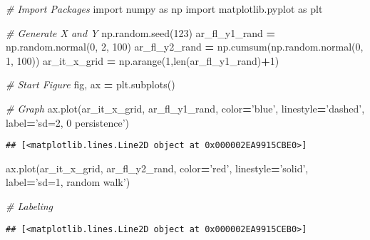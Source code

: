 \documentclass[
]{book}
\newenvironment{Shaded}{\begin{snugshade}}{\end{snugshade}}
\newcommand{\BuiltInTok}[1]{#1}
\newcommand{\CommentTok}[1]{\textcolor[rgb]{0.56,0.35,0.01}{\textit{#1}}}
\newcommand{\DecValTok}[1]{\textcolor[rgb]{0.00,0.00,0.81}{#1}}
\newcommand{\ImportTok}[1]{#1}
\newcommand{\NormalTok}[1]{#1}
\newcommand{\OperatorTok}[1]{\textcolor[rgb]{0.81,0.36,0.00}{\textbf{#1}}}
\newcommand{\StringTok}[1]{\textcolor[rgb]{0.31,0.60,0.02}{#1}}
\begin{document}
\begin{Shaded}
\begin{Highlighting}[]
\CommentTok{# Import Packages}
\ImportTok{import}\NormalTok{ numpy }\ImportTok{as}\NormalTok{ np}
\ImportTok{import}\NormalTok{ matplotlib.pyplot }\ImportTok{as}\NormalTok{ plt}

\CommentTok{# Generate X and Y}
\NormalTok{np.random.seed(}\DecValTok{123}\NormalTok{)}
\NormalTok{ar_fl_y1_rand }\OperatorTok{=}\NormalTok{ np.random.normal(}\DecValTok{0}\NormalTok{, }\DecValTok{2}\NormalTok{, }\DecValTok{100}\NormalTok{)}
\NormalTok{ar_fl_y2_rand }\OperatorTok{=}\NormalTok{ np.cumsum(np.random.normal(}\DecValTok{0}\NormalTok{, }\DecValTok{1}\NormalTok{, }\DecValTok{100}\NormalTok{))}
\NormalTok{ar_it_x_grid }\OperatorTok{=}\NormalTok{ np.arange(}\DecValTok{1}\NormalTok{,}\BuiltInTok{len}\NormalTok{(ar_fl_y1_rand)}\OperatorTok{+}\DecValTok{1}\NormalTok{)}

\CommentTok{# Start Figure}
\NormalTok{fig, ax }\OperatorTok{=}\NormalTok{ plt.subplots()}

\CommentTok{# Graph}
\NormalTok{ax.plot(ar_it_x_grid, ar_fl_y1_rand,}
\NormalTok{                     color}\OperatorTok{=}\StringTok{'blue'}\NormalTok{, linestyle}\OperatorTok{=}\StringTok{'dashed'}\NormalTok{,}
\NormalTok{                     label}\OperatorTok{=}\StringTok{'sd=2, 0 persistence'}\NormalTok{)}
\end{Highlighting}
\end{Shaded}

\begin{verbatim}
## [<matplotlib.lines.Line2D object at 0x000002EA9915CBE0>]
\end{verbatim}

\begin{Shaded}
\begin{Highlighting}[]
\NormalTok{ax.plot(ar_it_x_grid, ar_fl_y2_rand,}
\NormalTok{                     color}\OperatorTok{=}\StringTok{'red'}\NormalTok{, linestyle}\OperatorTok{=}\StringTok{'solid'}\NormalTok{,}
\NormalTok{                     label}\OperatorTok{=}\StringTok{'sd=1, random walk'}\NormalTok{)}
                     
\CommentTok{# Labeling}
\end{Highlighting}
\end{Shaded}

\begin{verbatim}
## [<matplotlib.lines.Line2D object at 0x000002EA9915CEB0>]
\end{verbatim}
\end{document}
